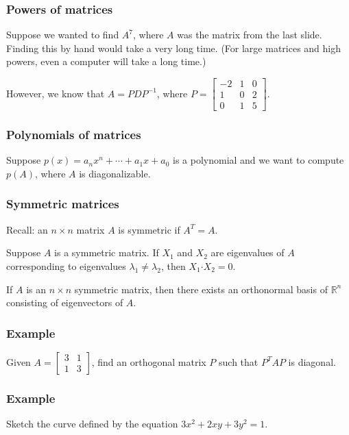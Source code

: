 \documentclass[11pt,t]{beamer}
\newcommand{\R}{\mathbb{R}}
\newcommand{\dotp}{\boldsymbol{\cdot}}
\begin{document}
\begin{frame}
\frametitle{Powers of matrices}

Suppose we wanted to find $A^7$, where $A$ was the matrix from the last slide. Finding this by hand would take a very long time. (For large matrices and high powers, even a computer will take a long time.)

However, we know that $A=PDP^{-1}$, where $P=\begin{bmatrix}-2&1&0\\1&0&2\\0&1&5\end{bmatrix}$.

\end{frame}
\begin{frame}
\frametitle{Polynomials of matrices}

Suppose $p(x) = a_nx^n+\cdots + a_1x+a_0$ is a polynomial and we want to compute $p(A)$, where $A$ is diagonalizable.
\end{frame}
\begin{frame}
\frametitle{Symmetric matrices}

Recall: an $n\times n$ matrix $A$ is \alert{symmetric} if $A^T=A$. 
\begin{theorem}
Suppose $A$ is a symmetric matrix. If $X_1$ and $X_2$ are eigenvalues of $A$ corresponding to eigenvalues $\lambda_1\neq \lambda_2$, then $X_1\dotp X_2=0$.
\end{theorem}
\begin{theorem}
If $A$ is an $n\times n$ symmetric matrix, then there exists an \alert{orthonormal basis} of $\R^n$ consisting of eigenvectors of $A$.
\end{theorem}
\end{frame}
\begin{frame}
\frametitle{Example}

Given $A=\begin{bmatrix}3&1\\1&3\end{bmatrix}$, find an orthogonal matrix $P$ such that $P^TAP$ is diagonal.
\end{frame}
\begin{frame}
\frametitle{Example}

Sketch the curve defined by the equation $3x^2+2xy+3y^2=1$.
\end{frame}
\end{document}
